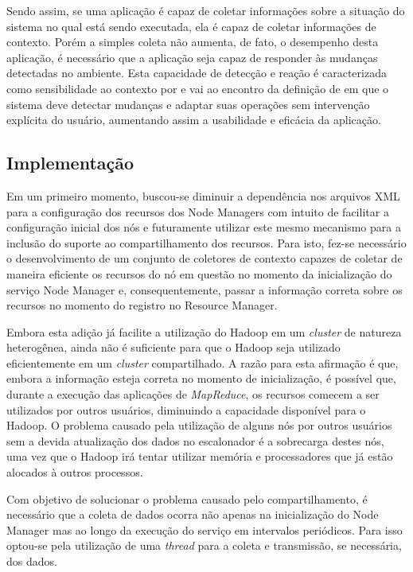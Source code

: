Sendo assim, se uma aplicação é capaz de coletar informações sobre a situação do sistema no qual está sendo executada, ela é capaz de coletar informações de contexto. Porém a simples coleta não aumenta, de fato, o desempenho desta aplicação, é necessário que a aplicação seja capaz de responder às mudanças detectadas no ambiente. Esta capacidade de detecção e reação é caracterizada como sensibilidade ao contexto por \citet{Maamar} e vai ao encontro da definição de \citet{Baldauf} em que o sistema deve detectar mudanças e adaptar suas operações sem intervenção explícita do usuário, aumentando assim a usabilidade e eficácia da aplicação.

\subsection{Implementação}
Em um primeiro momento, buscou-se diminuir a dependência nos arquivos XML para a configuração dos recursos dos Node Managers com intuito de facilitar a configuração inicial dos nós e futuramente utilizar este mesmo mecanismo para a inclusão do suporte ao compartilhamento dos recursos. Para isto, fez-se necessário o desenvolvimento de um conjunto de coletores de contexto capazes de coletar de maneira eficiente os recursos do nó em questão no momento da inicialização do serviço Node Manager e, consequentemente, passar a informação correta sobre os recursos no momento do registro no Resource Manager.

Embora esta adição já facilite a utilização do Hadoop em um \textit{cluster} de natureza heterogênea, ainda não é suficiente para que o Hadoop seja utilizado eficientemente em um \textit{cluster} compartilhado. A razão para esta afirmação é que, embora a informação esteja correta no momento de inicialização, é possível que, durante a execução das aplicações de \textit{MapReduce}, os recursos comecem a ser utilizados por outros usuários, diminuindo a capacidade disponível para o Hadoop. O problema causado pela utilização de alguns nós por outros usuários sem a devida atualização dos dados no escalonador é a sobrecarga destes nós, uma vez que o Hadoop irá tentar utilizar memória e processadores que já estão alocados à outros processos.

Com objetivo de solucionar o problema causado pelo compartilhamento, é necessário que a coleta de dados ocorra não apenas na inicialização do Node Manager mas ao longo da execução do serviço em intervalos periódicos. Para isso optou-se pela utilização de uma \textit{thread} para a coleta e transmissão, se necessária, dos dados.

